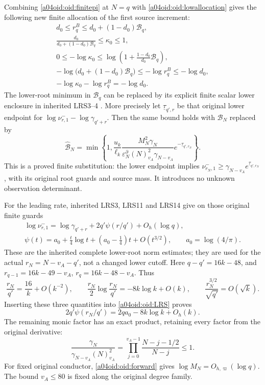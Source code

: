 \documentclass[11pt,a4paper]{article}
\begin{document}
Combining \eqref{a04oid:oid:finitepi} at $N=q$ with
\eqref{a04oid:oid:lowallocation} gives the following new finite allocation
of the first source increment:
\begin{equation}\label{a04oid:oid:finiteallocation}
 \boxed{\begin{gathered}
 d_0\le r_q^B\le d_0+(1-d_0)\mathcal B_q,\\
 \frac{d_0}{d_0+(1-d_0)\mathcal B_q}\le\kappa_0\le1,\\
 0\le-\log\kappa_0
 \le\log\left(1+\frac{1-d_0}{d_0}\mathcal B_q\right),\\
 -\log\bigl(d_0+(1-d_0)\mathcal B_q\bigr)
 \le-\log r_q^B\le-\log d_0,\\
 -\log\kappa_0-\log r_q^B=-\log d_0.
 \end{gathered}}
\end{equation}
The lower-root minimum in $\mathcal B_q$ can be replaced by its
explicit finite scalar lower enclosure in inherited LRS3--4
\cite{a04oid:InheritedLRS}. More precisely let
$\underline\tau_{q',r}$ be that original lower endpoint for
$\log\nu^-_{r,1}-\log\gamma_{q'+r}$. Then the same bound holds
with $\mathcal B_N$ replaced by
\begin{equation}\label{a04oid:oid:evaluatedfinitepi}
 \widehat{\mathcal B}_N=
 \min\left\{1,\frac{u_k}{\ell_k}
 \frac{M_N^2\gamma_N}
 {\varepsilon_N^\partial(N)_{v_A}^2\gamma_{N-v_A}}
 e^{-\underline\tau_{q',r_N}}\right\}.
\end{equation}
This is a proved finite substitution: the lower endpoint implies
$\nu^-_{r_N,1}\ge\gamma_{N-v_A}
e^{\underline\tau_{q',r_N}}$, with its original root guards and
source mass. It introduces no unknown observation determinant.

For the leading rate, inherited LRS3, LRS11 and LRS14
\cite{a04oid:InheritedLRS} give on those original finite guards
\begin{equation}\label{a04oid:oid:LRS}
 \begin{gathered}
 \log\nu^-_{r,1}=\log\gamma_{q'+r}+2q'\psi(r/q')+O_h(\log q),\\
 \psi(t)=a_0+\frac t4\log t+(a_0-\tfrac14)t+O(t^{3/2}),
 \qquad a_0=\log(4/\pi).
 \end{gathered}
\end{equation}
These are the inherited complete lower-root norm estimates; they
are used for the actual $r_N=N-v_A-q'$, not a changed lower cutoff.
Here $q-q'=16k-48$, and
$r_{q-1}=16k-49-v_A$, $r_q=16k-48-v_A$. Thus
\[
 \frac{r_N}{q'}=\frac{16}{k}+O(k^{-2}),\qquad
 \frac{r_N}{2}\log\frac{r_N}{q'}=-8k\log k+O(k),\qquad
 \frac{r_N^{3/2}}{\sqrt{q'}}=O(\sqrt k).
\]
Inserting these three quantities into \eqref{a04oid:oid:LRS} proves
\begin{equation}\label{a04oid:oid:profile}
 2q'\psi(r_N/q')=2qa_0-8k\log k+O_h(k).
\end{equation}
The remaining monic factor has an exact product, retaining every
factor from the original derivative:
\[
 \frac{\gamma_N}{\gamma_{N-v_A}(N)_{v_A}^2}
 =\prod_{j=0}^{v_A-1}\frac{N-j-1/2}{N-j}\le1.
\]
For fixed original conductor, \eqref{a04oid:oid:forward} gives
$\log M_N=O_{h,\varpi}(\log q)$. The bound $v_A\le80$
is fixed along the original degree family.
\end{document}
